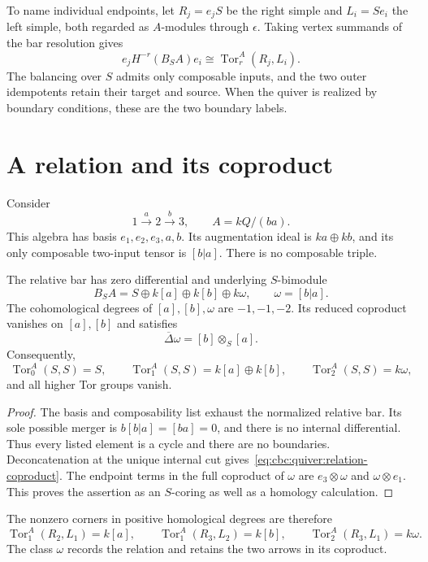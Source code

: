 To name individual endpoints, let $R_j=e_jS$ be the right simple and $L_i=Se_i$ the left simple, both regarded as $A$-modules through $\epsilon$.
Taking vertex summands of the bar resolution gives
\begin{equation}\label{eq:cbc:quiver:corners}
 e_jH^{-r}(B_SA)e_i
 \cong\operatorname{Tor}^A_r(R_j,L_i).
\end{equation}
The balancing over $S$ admits only composable inputs, and the two outer idempotents retain their target and source.
When the quiver is realized by boundary conditions, these are the two boundary labels.

\section{A relation and its coproduct}

Consider
\[
 1\xrightarrow{a}2\xrightarrow{b}3,\qquad A=kQ/(ba).
\]
This algebra has basis $e_1,e_2,e_3,a,b$.
Its augmentation ideal is $ka\oplus kb$, and its only composable two-input tensor is $[b|a]$.
There is no composable triple.

\begin{theorem}\label{thm:quiver-bar}
The relative bar has zero differential and underlying $S$-bimodule
\[
 B_SA=S\oplus k[a]\oplus k[b]\oplus k\omega,
 \qquad \omega=[b|a].
\]
The cohomological degrees of $[a],[b],\omega$ are $-1,-1,-2$.
Its reduced coproduct vanishes on $[a],[b]$ and satisfies
\begin{equation}\label{eq:cbc:quiver:relation-coproduct}
 \overline\Delta\omega=[b]\otimes_S[a].
\end{equation}
Consequently,
\[
 \operatorname{Tor}^A_0(S,S)=S,\qquad
 \operatorname{Tor}^A_1(S,S)=k[a]\oplus k[b],\qquad
 \operatorname{Tor}^A_2(S,S)=k\omega,
\]
and all higher Tor groups vanish.
\end{theorem}
\begin{proof}
The basis and composability list exhaust the normalized relative bar.
Its sole possible merger is $b[b|a]=[ba]=0$, and there is no internal differential.
Thus every listed element is a cycle and there are no boundaries.
Deconcatenation at the unique internal cut gives~\eqref{eq:cbc:quiver:relation-coproduct}.
The endpoint terms in the full coproduct of $\omega$ are $e_3\otimes\omega$ and $\omega\otimes e_1$.
This proves the assertion as an $S$-coring as well as a homology calculation.
\end{proof}

The nonzero corners in positive homological degrees are therefore
\[
 \operatorname{Tor}^A_1(R_2,L_1)=k[a],\qquad
 \operatorname{Tor}^A_1(R_3,L_2)=k[b],\qquad
 \operatorname{Tor}^A_2(R_3,L_1)=k\omega.
\]
The class $\omega$ records the relation and retains the two arrows in its coproduct.

